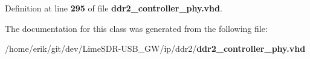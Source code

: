 Definition at line {\bf 295} of file {\bf ddr2\+\_\+controller\+\_\+phy.\+vhd}.



The documentation for this class was generated from the following file\+:\begin{DoxyCompactItemize}
\item 
/home/erik/git/dev/\+Lime\+S\+D\+R-\/\+U\+S\+B\+\_\+\+G\+W/ip/ddr2/{\bf ddr2\+\_\+controller\+\_\+phy.\+vhd}\end{DoxyCompactItemize}

